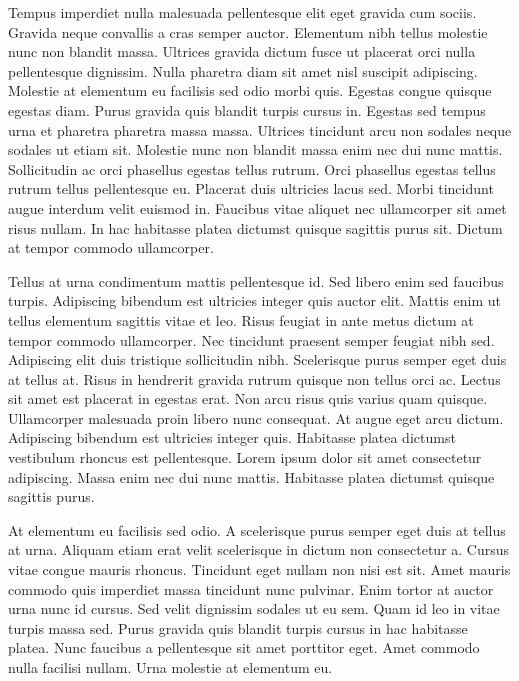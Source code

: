\documentclass[conference]{IEEEtran}
\begin{document}
Tempus imperdiet nulla malesuada pellentesque elit eget gravida cum sociis. Gravida neque convallis a cras semper auctor. Elementum nibh tellus molestie nunc non blandit massa. Ultrices gravida dictum fusce ut placerat orci nulla pellentesque dignissim. Nulla pharetra diam sit amet nisl suscipit adipiscing. Molestie at elementum eu facilisis sed odio morbi quis. Egestas congue quisque egestas diam. Purus gravida quis blandit turpis cursus in. Egestas sed tempus urna et pharetra pharetra massa massa. Ultrices tincidunt arcu non sodales neque sodales ut etiam sit. Molestie nunc non blandit massa enim nec dui nunc mattis. Sollicitudin ac orci phasellus egestas tellus rutrum. Orci phasellus egestas tellus rutrum tellus pellentesque eu. Placerat duis ultricies lacus sed. Morbi tincidunt augue interdum velit euismod in. Faucibus vitae aliquet nec ullamcorper sit amet risus nullam. In hac habitasse platea dictumst quisque sagittis purus sit. Dictum at tempor commodo ullamcorper.

Tellus at urna condimentum mattis pellentesque id. Sed libero enim sed faucibus turpis. Adipiscing bibendum est ultricies integer quis auctor elit. Mattis enim ut tellus elementum sagittis vitae et leo. Risus feugiat in ante metus dictum at tempor commodo ullamcorper. Nec tincidunt praesent semper feugiat nibh sed. Adipiscing elit duis tristique sollicitudin nibh. Scelerisque purus semper eget duis at tellus at. Risus in hendrerit gravida rutrum quisque non tellus orci ac. Lectus sit amet est placerat in egestas erat. Non arcu risus quis varius quam quisque. Ullamcorper malesuada proin libero nunc consequat. At augue eget arcu dictum. Adipiscing bibendum est ultricies integer quis. Habitasse platea dictumst vestibulum rhoncus est pellentesque. Lorem ipsum dolor sit amet consectetur adipiscing. Massa enim nec dui nunc mattis. Habitasse platea dictumst quisque sagittis purus.

At elementum eu facilisis sed odio. A scelerisque purus semper eget duis at tellus at urna. Aliquam etiam erat velit scelerisque in dictum non consectetur a. Cursus vitae congue mauris rhoncus. Tincidunt eget nullam non nisi est sit. Amet mauris commodo quis imperdiet massa tincidunt nunc pulvinar. Enim tortor at auctor urna nunc id cursus. Sed velit dignissim sodales ut eu sem. Quam id leo in vitae turpis massa sed. Purus gravida quis blandit turpis cursus in hac habitasse platea. Nunc faucibus a pellentesque sit amet porttitor eget. Amet commodo nulla facilisi nullam. Urna molestie at elementum eu.
\end{document}
